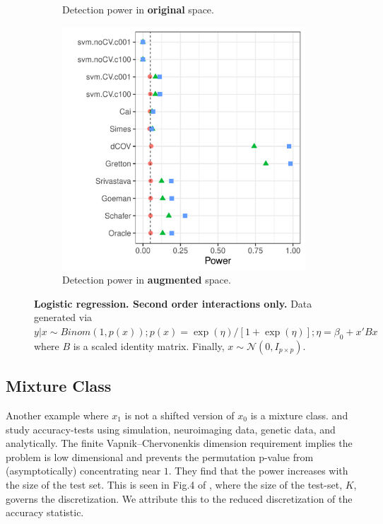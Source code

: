 \documentclass[oupdraft]{bio}
\begin{document}
\begin{figure}[th]
\begin{subfigure}[t]{.3\columnwidth}
	\caption{Detection power in \textbf{original} space.} 
	\label{fig:logistic-interactions-only-original}
	\end{subfigure}
	\begin{subfigure}[t]{.3\columnwidth}
	\centering
	\includegraphics[width=1\columnwidth]{"file43"}
	\caption{Detection power in \textbf{augmented} space.} 
	\label{fig:logistic-interactions-only-augmented}
	\end{subfigure}
	\caption{\textbf{Logistic regression. Second order interactions only.}
		Data generated via $y|x \sim Binom(1,p(x));
		p(x)=\exp(\eta)/[1+\exp(\eta)];
		\eta=\beta_0+x'Bx$ 
		where $B$ is a scaled identity matrix.
		Finally, $x\sim \mathcal{N}(0,I_{p\times p})$.	
	}
	\label{fig:logistic-interactions-only}
\end{figure}







\subsection{Mixture Class}

Another example where $x_1$ is not a shifted version of $x_0$ is a mixture class. 
\cite{golland_permutation_2003} and \cite{golland_permutation_2005} study accuracy-tests using simulation, neuroimaging data, genetic data, and analytically.
The finite Vapnik–Chervonenkis dimension requirement \cite[Sec 4.3]{golland_permutation_2005} implies the problem is low dimensional and prevents the permutation p-value from (asymptotically) concentrating near $1$. 
They find that the power increases with the size of the test set.
This is seen in Fig.4 of \cite{golland_permutation_2005}, where the size of the test-set, $K$, governs the discretization. 
We attribute this to the reduced discretization of the accuracy statistic.
\end{document}
